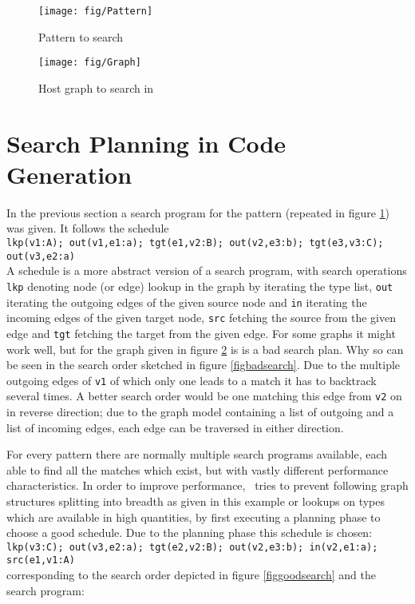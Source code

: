 \begin{figure}[htbp]
  \centering
  \texttt{[image: fig/Pattern]}
  \caption{Pattern to search}
  \label{figpatterntosearch}
\end{figure}

\begin{figure}[htbp]
  \centering
  \texttt{[image: fig/Graph]}
  \caption{Host graph to search in}
  \label{figgraphtosearchin}
\end{figure}


\section{Search Planning in Code Generation}
\label{searchplanning}

In the previous section a search program for the pattern (repeated in figure \ref{figpatterntosearch}) was given.
It follows the schedule\\
\texttt{lkp(v1:A); out(v1,e1:a); tgt(e1,v2:B); out(v2,e3:b); tgt(e3,v3:C); out(v3,e2:a)}\\
A schedule is a more abstract version of a search program, with search operations \texttt{lkp} denoting node (or edge) lookup in the graph by iterating the type list, \texttt{out} iterating the outgoing edges of the given source node and \texttt{in} iterating the incoming edges of the given target node, \texttt{src} fetching the source from the given edge and \texttt{tgt} fetching the target from the given edge.
For some graphs it might work well, but for the graph given in figure \ref{figgraphtosearchin} is is a bad search plan. Why so can be seen in the search order sketched in figure \ref{figbadsearch}.
Due to the multiple outgoing edges of \texttt{v1} of which only one leads to a match it has to backtrack several times. A better search order would be one matching this edge from \texttt{v2} on in reverse direction; due to the graph model containing a list of outgoing and a list of incoming edges, each edge can be traversed in either direction.

For every pattern there are normally multiple search programs available,
each able to find all the matches which exist, but with vastly different performance characteristics.
In order to improve performance, \GrG~tries to prevent following graph structures splitting into breadth as given in this example or lookups on types which are available in high quantities, by first executing a planning phase to choose a good schedule. Due to the planning phase this schedule is chosen:\\
\texttt{lkp(v3:C); out(v3,e2:a); tgt(e2,v2:B); out(v2,e3:b); in(v2,e1:a); src(e1,v1:A)}\\
corresponding to the search order depicted in figure \ref{figgoodsearch} and the search program:

